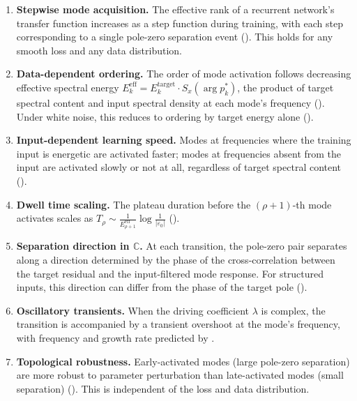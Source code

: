 \documentclass[11pt,a4paper]{article}
\theoremstyle{definition}
\newcommand{\C}{\mathbb{C}}
\newcommand{\eps}{\varepsilon}
\begin{document}
\begin{enumerate}[label=\textbf{P\arabic*.}]
  \item \textbf{Stepwise mode acquisition.} The effective rank
    of a recurrent network's transfer function increases
    as a step function during training, with each step
    corresponding to a single pole-zero separation event
    (). This holds for any smooth loss and
    any data distribution.

  \item \textbf{Data-dependent ordering.} The order of mode
    activation follows decreasing effective spectral energy
    $E_k^{\mathrm{eff}} = E_k^{\mathrm{target}} \cdot S_x(\arg p_k^*)$,
    the product of target spectral content and input spectral
    density at each mode's frequency ().
    Under white noise, this reduces to ordering by target
    energy alone ().

  \item \textbf{Input-dependent learning speed.} Modes at
    frequencies where the training input is energetic are
    activated faster; modes at frequencies absent from the input
    are activated slowly or not at all, regardless of target
    spectral content ().

  \item \textbf{Dwell time scaling.}
    The plateau duration before the $(\rho+1)$-th mode activates
    scales as
    $T_\rho \sim \frac{1}{E_{\rho+1}^{\mathrm{eff}}}
    \log\frac{1}{|\eps_0|}$
    ().

  \item \textbf{Separation direction in $\C$.} At each
    transition, the pole-zero pair separates along a direction
    determined by the phase of the cross-correlation between the
    target residual and the input-filtered mode response. For
    structured inputs, this direction can differ from the phase
    of the target pole ().

  \item \textbf{Oscillatory transients.} When the driving
    coefficient $\lambda$ is complex, the transition is
    accompanied by a transient overshoot at the mode's frequency,
    with frequency and growth rate predicted by
    .

  \item \textbf{Topological robustness.} Early-activated modes
    (large pole-zero separation) are more robust to parameter
    perturbation than late-activated modes (small separation)
    (). This is independent of the loss
    and data distribution.


\end{enumerate}
\end{document}
